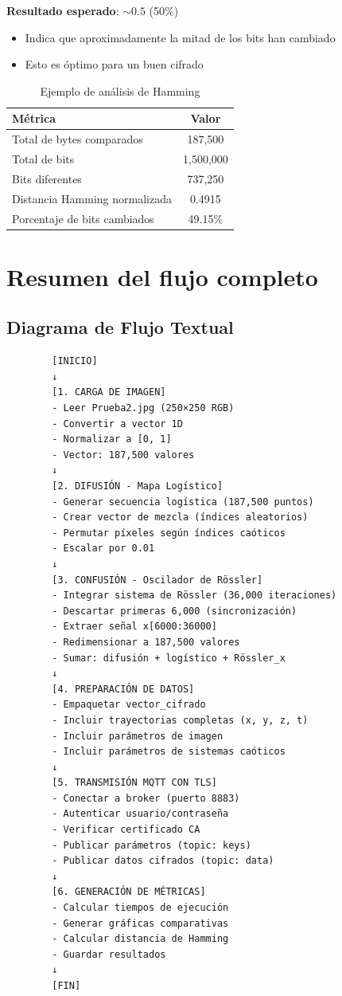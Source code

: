 \documentclass[12pt,a4paper]{article}
\begin{document}
	\textbf{Resultado esperado}: $\sim 0.5$ (50\%)
	\begin{itemize}
		\item Indica que aproximadamente la mitad de los bits han cambiado
		\item Esto es óptimo para un buen cifrado
	\end{itemize}
	
	\begin{table}[H]
		\centering
		\caption{Ejemplo de análisis de Hamming}
		\label{tab:hamming}
		\begin{tabular}{@{}lc@{}}
			\toprule
			\textbf{Métrica} & \textbf{Valor} \\ \midrule
			Total de bytes comparados & 187,500 \\
			Total de bits & 1,500,000 \\
			Bits diferentes & 737,250 \\
			Distancia Hamming normalizada & 0.4915 \\
			Porcentaje de bits cambiados & 49.15\% \\ \bottomrule
		\end{tabular}
	\end{table}
	
	\section{Resumen del flujo completo}
	
	\subsection{Diagrama de Flujo Textual}
	
	\begin{verbatim}
		[INICIO]
		↓
		[1. CARGA DE IMAGEN]
		- Leer Prueba2.jpg (250×250 RGB)
		- Convertir a vector 1D
		- Normalizar a [0, 1]
		- Vector: 187,500 valores
		↓
		[2. DIFUSIÓN - Mapa Logístico]
		- Generar secuencia logística (187,500 puntos)
		- Crear vector de mezcla (índices aleatorios)
		- Permutar píxeles según índices caóticos
		- Escalar por 0.01
		↓
		[3. CONFUSIÓN - Oscilador de Rössler]
		- Integrar sistema de Rössler (36,000 iteraciones)
		- Descartar primeras 6,000 (sincronización)
		- Extraer señal x[6000:36000]
		- Redimensionar a 187,500 valores
		- Sumar: difusión + logístico + Rössler_x
		↓
		[4. PREPARACIÓN DE DATOS]
		- Empaquetar vector_cifrado
		- Incluir trayectorias completas (x, y, z, t)
		- Incluir parámetros de imagen
		- Incluir parámetros de sistemas caóticos
		↓
		[5. TRANSMISIÓN MQTT CON TLS]
		- Conectar a broker (puerto 8883)
		- Autenticar usuario/contraseña
		- Verificar certificado CA
		- Publicar parámetros (topic: keys)
		- Publicar datos cifrados (topic: data)
		↓
		[6. GENERACIÓN DE MÉTRICAS]
		- Calcular tiempos de ejecución
		- Generar gráficas comparativas
		- Calcular distancia de Hamming
		- Guardar resultados
		↓
		[FIN]
	\end{verbatim}
	
	
\end{document}
